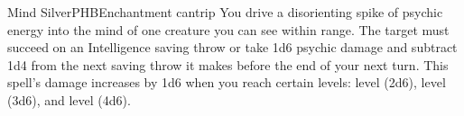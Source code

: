 \begin{spell}{Mind Silver}{PHB}{Enchantment cantrip}
{
}
You drive a disorienting spike of psychic energy into
the mind of one creature you can see within range.
The target must succeed on an Intelligence saving
throw or take 1d6 psychic damage and subtract 1d4
from the next saving throw it makes before the end
of your next turn.
This spell's damage increases by 1d6 when you
reach certain levels:  level (2d6),  level (3d6),
and  level (4d6).
\end{spell}